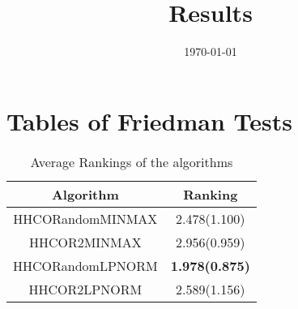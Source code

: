 \documentclass{article}
\title{Results}
\author{}
\date{\today}
\begin{document}
\oddsidemargin 0in \topmargin 0in\maketitle
\section{Tables of Friedman Tests}
\begin{table}[!htp]
\centering
\caption{Average Rankings of the algorithms
}\begin{tabular}{|c|c|}
\hline
Algorithm&Ranking\\
\hline
HHCORandomMINMAX&2.478(1.100)\\\hline
HHCOR2MINMAX&2.956(0.959)\\\hline
HHCORandomLPNORM& {\bf 1.978(0.875)}\\\hline
HHCOR2LPNORM&2.589(1.156)\\\hline
\end{tabular}
\end{table}
\end{document}
